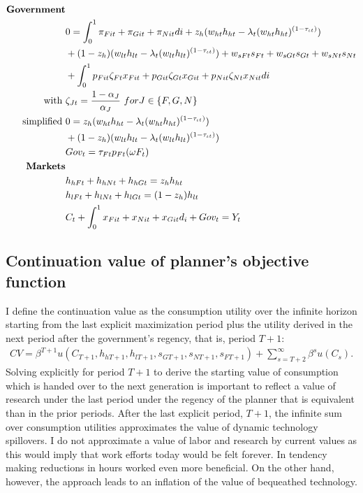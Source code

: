 \begin{align}
\text{\textbf{Government}}&\nonumber\\
&0=\int_{0}^{1}\pi_{Fit}+\pi_{Git}+\pi_{Nit}di+z_h(w_{ht}h_{ht}-\lambda_t(w_{ht}h_{ht})^{(1-\tau_{\iota t})})\nonumber\\&+(1-z_h)(w_{lt}h_{lt}-\lambda_t(w_{lt}h_{lt})^{(1-\tau_{\iota t})})+w_{sFt}s_{Ft}+w_{sGt}s_{Gt}+w_{sNt}s_{Nt}\nonumber\\ &+\int_{0}^{1} p_{Fit}\zeta_{Ft}x_{Fit}+p_{Git}\zeta_{Gt}x_{Git}+ p_{Nit}\zeta_{Nt}x_{Nit}di\nonumber\\
\text{with}\ \vspace{4mm}&\zeta_{Jt}=\frac{1-\alpha_J}{\alpha_J}\ for J\in\{F,G,N\}\nonumber \\
\text{simplified}\ \vspace{4mm} & 0= z_h(w_{ht}h_{ht}-\lambda_t(w_{ht}h_{ht})^{(1-\tau_{\iota t})})\nonumber\\&+(1-z_h)(w_{lt}h_{lt}-\lambda_t(w_{lt}h_{lt})^{(1-\tau_{\iota t})})
\nonumber\\\
&Gov_t=\tau_{Ft}p_{Ft}(\omega F_t)\nonumber \\
\text{\textbf{Markets}}&\\
&h_{hFt}+h_{hNt}+h_{hGt}=z_{h} h_{ht}\nonumber\\
&h_{lFt}+h_{lNt}+h_{lGt}=(1-z_h) h_{lt}\nonumber\\
&C_{t}+\int_{0}^{1} x_{Fit}+x_{Nit}+x_{Git}d_i+Gov_t=Y_t\nonumber
\end{align}

\subsection{Continuation value of planner's objective function}\label{app:PV}
I define the continuation value as the consumption utility over the infinite horizon starting from the last explicit maximization period plus the utility derived in the next period after the government's regency, that is, period $T+1$:
\begin{align}
CV=\beta^{T+1} u(C_{T+1},h_{h{T+1}}, h_{l{T+1}}, s_{G{T+1}}, s_{N{T+1}}, s_{F{T+1}})+\sum_{s=T+2}^{\infty} \beta^{s}u(C_s). %
\end{align}
Solving explicitly for period $T+1$ to derive the starting value of consumption which is handed over to the next generation is important to reflect a value of research under the last period under the regency of the planner that is equivalent than in the prior periods.
After the last explicit period, $T+1$, the infinite sum over consumption utilities approximates the value of dynamic technology spillovers. 
I do not approximate a value of labor and research by current values as this would imply that work efforts today would be felt forever. In tendency making reductions in hours worked even more beneficial. On the other hand, however, the approach leads to an inflation of the value of bequeathed technology. 


